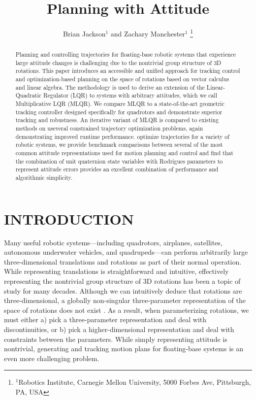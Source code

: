 \documentclass[letterpaper, 10 pt, conference]{ieeeconf}  %
\title{\LARGE \bf
Planning with Attitude
}
\author{Brian Jackson$^1$ and Zachary Manchester$^1$%
    \thanks{
        $^1$Robotics Institute, 
        Carnegie Mellon University, 
        5000 Forbes Ave, Pittsburgh, PA, USA
    }
}
\begin{document}
\maketitle

\begin{abstract}
Planning and controlling trajectories for floating-base robotic systems that experience
large attitude changes is challenging due to the nontrivial group structure of 3D
rotations. This paper introduces an accessible and unified approach for tracking control
and optimization-based planning on the space of rotations based on vector calculus and
linear algebra. The methodology is used to derive an extension of the Linear-Quadratic
Regulator (LQR) to systems with arbitrary attitudes, which we call Multiplicative LQR
(MLQR). We compare MLQR to a state-of-the-art geometric tracking controller designed
specifically for quadrotors and demonstrate superior tracking and robustness. An
iterative variant of MLQR is compared to existing methods on useveral constrained
trajectory optimization problems, again demonstrating improved runtime performance. %
optimize trajectories for a variety of robotic systems, we provide benchmark comparisons
between several of the most common attitude representations used for motion planning and
control and find that the combination of unit quaternion state variables with Rodrigues
parameters to represent attitude errors provides an excellent combination of performance
and algorithmic simplicity.
\end{abstract}

\section{INTRODUCTION}
    Many useful robotic systems---including quadrotors, airplanes, satellites, autonomous 
    underwater vehicles, and quadrupeds---can perform arbitrarily large three-dimensional 
    translations and rotations as part of their normal operation. 
    While representing translations is straightforward and intuitive, effectively 
    representing the nontrivial group structure of 3D rotations has been a topic of study 
    for many decades. Although we can intuitively deduce that rotations are three-dimensional, 
    a globally non-singular three-parameter representation of the space of rotations does 
    not exist \cite{stuelpnagel1964parametrization}. As a result, when parameterizing rotations, 
    we must either a) pick a three-parameter representation and deal with discontinuities, 
    or b) pick a higher-dimensional representation and deal with constraints between the 
    parameters. While simply representing attitude is nontrivial, generating and tracking 
    motion plans for floating-base systems is an even more challenging problem.
    
\end{document}

